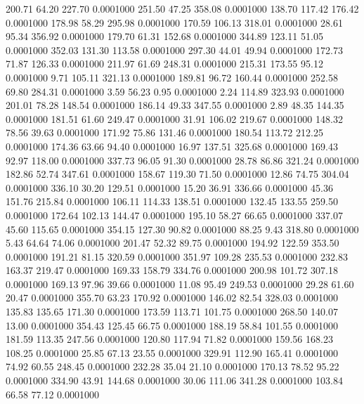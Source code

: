  200.71   64.20  227.70   0.0001000
 251.50   47.25  358.08   0.0001000
 138.70  117.42  176.42   0.0001000
 178.98   58.29  295.98   0.0001000
 170.59  106.13  318.01   0.0001000
  28.61   95.34  356.92   0.0001000
 179.70   61.31  152.68   0.0001000
 344.89  123.11   51.05   0.0001000
 352.03  131.30  113.58   0.0001000
 297.30   44.01   49.94   0.0001000
 172.73   71.87  126.33   0.0001000
 211.97   61.69  248.31   0.0001000
 215.31  173.55   95.12   0.0001000
   9.71  105.11  321.13   0.0001000
 189.81   96.72  160.44   0.0001000
 252.58   69.80  284.31   0.0001000
   3.59   56.23    0.95   0.0001000
   2.24  114.89  323.93   0.0001000
 201.01   78.28  148.54   0.0001000
 186.14   49.33  347.55   0.0001000
   2.89   48.35  144.35   0.0001000
 181.51   61.60  249.47   0.0001000
  31.91  106.02  219.67   0.0001000
 148.32   78.56   39.63   0.0001000
 171.92   75.86  131.46   0.0001000
 180.54  113.72  212.25   0.0001000
 174.36   63.66   94.40   0.0001000
  16.97  137.51  325.68   0.0001000
 169.43   92.97  118.00   0.0001000
 337.73   96.05   91.30   0.0001000
  28.78   86.86  321.24   0.0001000
 182.86   52.74  347.61   0.0001000
 158.67  119.30   71.50   0.0001000
  12.86   74.75  304.04   0.0001000
 336.10   30.20  129.51   0.0001000
  15.20   36.91  336.66   0.0001000
  45.36  151.76  215.84   0.0001000
 106.11  114.33  138.51   0.0001000
 132.45  133.55  259.50   0.0001000
 172.64  102.13  144.47   0.0001000
 195.10   58.27   66.65   0.0001000
 337.07   45.60  115.65   0.0001000
 354.15  127.30   90.82   0.0001000
  88.25    9.43  318.80   0.0001000
   5.43   64.64   74.06   0.0001000
 201.47   52.32   89.75   0.0001000
 194.92  122.59  353.50   0.0001000
 191.21   81.15  320.59   0.0001000
 351.97  109.28  235.53   0.0001000
 232.83  163.37  219.47   0.0001000
 169.33  158.79  334.76   0.0001000
 200.98  101.72  307.18   0.0001000
 169.13   97.96   39.66   0.0001000
  11.08   95.49  249.53   0.0001000
  29.28   61.60   20.47   0.0001000
 355.70   63.23  170.92   0.0001000
 146.02   82.54  328.03   0.0001000
 135.83  135.65  171.30   0.0001000
 173.59  113.71  101.75   0.0001000
 268.50  140.07   13.00   0.0001000
 354.43  125.45   66.75   0.0001000
 188.19   58.84  101.55   0.0001000
 181.59  113.35  247.56   0.0001000
 120.80  117.94   71.82   0.0001000
 159.56  168.23  108.25   0.0001000
  25.85   67.13   23.55   0.0001000
 329.91  112.90  165.41   0.0001000
  74.92   60.55  248.45   0.0001000
 232.28   35.04   21.10   0.0001000
 170.13   78.52   95.22   0.0001000
 334.90   43.91  144.68   0.0001000
  30.06  111.06  341.28   0.0001000
 103.84   66.58   77.12   0.0001000

